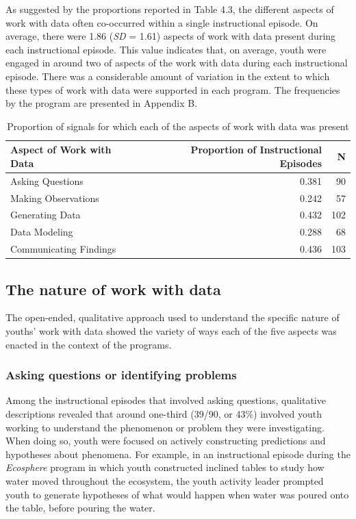 \documentclass[]{msu-thesis}
\theoremstyle{definition}
\theoremstyle{definition}
\theoremstyle{definition}
\theoremstyle{remark}
\begin{document}
As suggested by the proportions reported in Table 4.3, the different
aspects of work with data often co-occurred within a single
instructional episode. On average, there were 1.86 (\emph{SD} = 1.61)
aspects of work with data present during each instructional episode.
This value indicates that, on average, youth were engaged in around two
of aspects of the work with data during each instructional episode.
There was a considerable amount of variation in the extent to which
these types of work with data were supported in each program. The
frequencies by the program are presented in Appendix B.

\begin{table}

\caption{\label{tab:unnamed-chunk-9}Proportion of signals for which each of the aspects of work with data was present}
\centering
\begin{tabular}[t]{lrr}
\toprule
Aspect of Work with Data & Proportion of Instructional Episodes & N\\
\midrule
Asking Questions & 0.381 & 90\\
Making Observations & 0.242 & 57\\
Generating Data & 0.432 & 102\\
Data Modeling & 0.288 & 68\\
Communicating Findings & 0.436 & 103\\
\bottomrule
\end{tabular}
\end{table}

\subsection{The nature of work with
data}\label{the-nature-of-work-with-data}

The open-ended, qualitative approach used to understand the specific
nature of youths' work with data showed the variety of ways each of the
five aspects was enacted in the context of the programs.

\subsubsection{Asking questions or identifying
problems}\label{asking-questions-or-identifying-problems}

Among the instructional episodes that involved asking questions,
qualitative descriptions revealed that around one-third (39/90, or 43\%)
involved youth working to understand the phenomenon or problem they were
investigating. When doing so, youth were focused on actively
constructing predictions and hypotheses about phenomena. For example, in
an instructional episode during the \emph{Ecosphere} program in which
youth constructed inclined tables to study how water moved throughout
the ecosystem, the youth activity leader prompted youth to generate
hypotheses of what would happen when water was poured onto the table,
before pouring the water.
\end{document}
